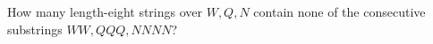 How many length-eight strings over $W,Q,N$ contain none of the consecutive substrings $WW,QQQ,NNNN$?
